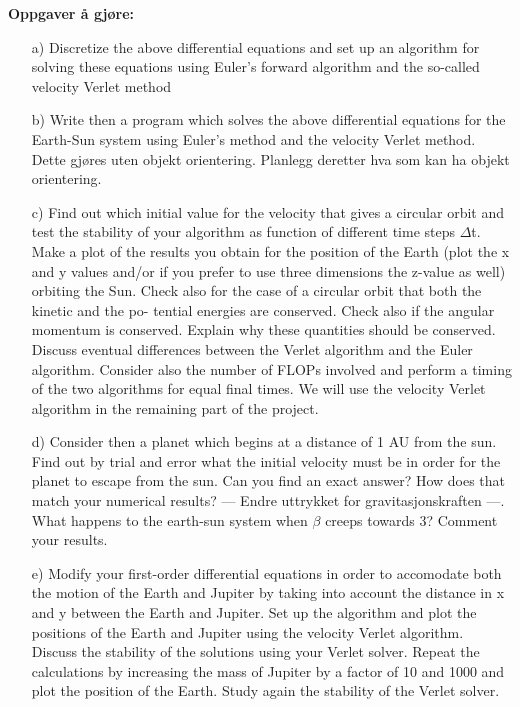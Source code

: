 \documentclass{article}
\begin{document}
\textbf{Oppgaver å gjøre:}
\begin{itemize}
    \item[a)] Discretize the above differential equations and set up an algorithm for solving these equations using Euler’s forward algorithm and the so-called velocity Verlet method \\
    \item[b)] Write then a program which solves the above differential equations for the Earth-Sun system using Euler’s method and the velocity Verlet method. Dette gjøres uten objekt orientering. Planlegg deretter hva som kan ha objekt orientering. \\
    \item[c)] Find out which initial value for the velocity that gives a circular orbit and test the stability of your algorithm as function of different time steps $\Delta$t. Make a plot of the results you obtain for the position of the Earth (plot the x and y values and/or if you prefer to use three dimensions the z-value as well) orbiting the Sun. Check also for the case of a circular orbit that both the kinetic and the po- tential energies are conserved. Check also if the angular momentum is conserved. Explain why these quantities should be conserved. Discuss eventual differences between the Verlet algorithm and the Euler algorithm. Consider also the number of FLOPs involved and perform a timing of the two algorithms for equal final times. We will use the velocity Verlet algorithm in the remaining part of the project. \\
    \item[d)] Consider then a planet which begins at a distance of 1 AU from the sun. Find out by trial and error what the initial velocity must be in order for the planet to escape from the sun. Can you find an exact answer? How does that match your numerical results? --- Endre uttrykket for gravitasjonskraften ---. What happens to the earth-sun system when $\beta$ creeps towards 3? Comment your results. \\
    \item[e)] Modify your first-order differential equations in order to accomodate both the motion of the Earth and Jupiter by taking into account the distance in x and y between the Earth and Jupiter. Set up the algorithm and plot the positions of the Earth and Jupiter using the velocity Verlet algorithm. Discuss the stability of the solutions using your Verlet solver. Repeat the calculations by increasing the mass of Jupiter by a factor of 10 and 1000 and plot the position of the Earth. Study again the stability of the Verlet solver. \\

\end{itemize}
\end{document}
